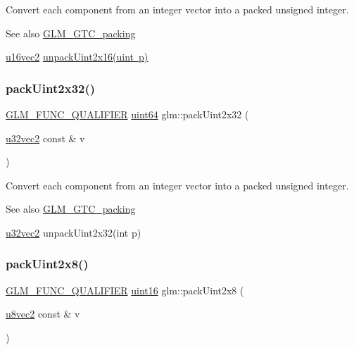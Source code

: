 Convert each component from an integer vector into a packed unsigned integer.

\begin{DoxySeeAlso}{See also}
\mbox{\hyperlink{group__gtc__packing}{G\+L\+M\+\_\+\+G\+T\+C\+\_\+packing}} 

\mbox{\hyperlink{group__gtc__type__precision_ga50bd2ceeb100a187e7c46f135269a0ec}{u16vec2}} \mbox{\hyperlink{group__gtc__packing_ga7778efa924e6efc386cb9f373bb06b72}{unpack\+Uint2x16(uint p)}} 
\end{DoxySeeAlso}
\mbox{\label{group__gtc__packing_ga4c4e4d6ab81a6b14cf066b40b6967c0a}} 
\subsubsection{\texorpdfstring{pack\+Uint2x32()}{packUint2x32()}}
{\footnotesize\ttfamily \mbox{\hyperlink{setup_8hpp_a33fdea6f91c5f834105f7415e2a64407}{G\+L\+M\+\_\+\+F\+U\+N\+C\+\_\+\+Q\+U\+A\+L\+I\+F\+I\+ER}} \mbox{\hyperlink{group__gtc__type__precision_gae3632bf9b37da66233d78930dd06378a}{uint64}} glm\+::pack\+Uint2x32 (\begin{DoxyParamCaption}\item[{\mbox{\hyperlink{group__gtc__type__precision_gad854a1005ce84d8f6e8f05e42893f5c9}{u32vec2}} const \&}]{v }\end{DoxyParamCaption})}

Convert each component from an integer vector into a packed unsigned integer.

\begin{DoxySeeAlso}{See also}
\mbox{\hyperlink{group__gtc__packing}{G\+L\+M\+\_\+\+G\+T\+C\+\_\+packing}} 

\mbox{\hyperlink{group__gtc__type__precision_gad854a1005ce84d8f6e8f05e42893f5c9}{u32vec2}} unpack\+Uint2x32(int p) 
\end{DoxySeeAlso}
\mbox{\label{group__gtc__packing_ga4a431a30aa5dfb425be3ea84fe561844}} 
\subsubsection{\texorpdfstring{pack\+Uint2x8()}{packUint2x8()}}
{\footnotesize\ttfamily \mbox{\hyperlink{setup_8hpp_a33fdea6f91c5f834105f7415e2a64407}{G\+L\+M\+\_\+\+F\+U\+N\+C\+\_\+\+Q\+U\+A\+L\+I\+F\+I\+ER}} \mbox{\hyperlink{group__gtc__type__precision_gad8c2939e1fdd8e5828b31d95c52255d5}{uint16}} glm\+::pack\+Uint2x8 (\begin{DoxyParamCaption}\item[{\mbox{\hyperlink{group__gtc__type__precision_ga01e28d0272428f94d22ea6111f0112be}{u8vec2}} const \&}]{v }\end{DoxyParamCaption})}

